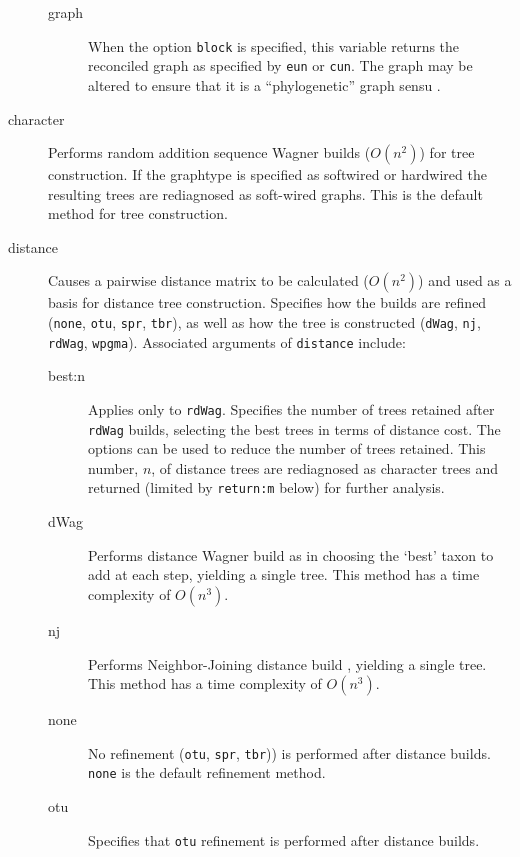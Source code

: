 \begin{description}
\begin{description}
			\item[graph] When the option \texttt{block} is specified, this variable returns the 
			reconciled graph as specified by \texttt{eun} or \texttt{cun}. The graph may be 
			altered to ensure that it is a ``phylogenetic'' graph sensu \cite{Moretetal2005}.
		\end{description}			
		
		\item [character] Performs random addition sequence Wagner \citep{Farris1970} builds 
		($O(n^2)$) for tree construction. If the graphtype is specified as softwired or hardwired 
		the resulting trees are rediagnosed as soft-wired graphs. This is 
		the default method for tree construction.
		
		\item [distance] Causes a pairwise distance matrix to be calculated ($O(n^2)$) and used 
		as a basis for distance tree construction. Specifies how the builds are refined (\texttt{none}, 
		\texttt{otu}, \texttt{spr}, \texttt{tbr}), as well as how the tree is constructed (\texttt{dWag}, 
		\texttt{nj}, \texttt{rdWag}, \texttt{wpgma}). Associated arguments of \texttt{distance} include:
				
		\begin{description}
			\item[best:n] Applies only to \texttt{rdWag}. Specifies the number of trees retained 
			after 	\texttt{rdWag} builds, selecting the best trees in terms of distance cost. The 
			options can be used to reduce the number of trees retained.  
			This number, $n$, of distance trees are rediagnosed as character trees
			and returned (limited by \texttt{return:m} below) for further analysis.
			
			\item[dWag] Performs distance Wagner build as in \citep{Farris1972} choosing the 
			`best' taxon to 
			add at each step, yielding a single tree. This method has a time complexity of $O(n^3)$.

			\item[nj] Performs Neighbor-Joining distance build \citep{Saitou1987}, yielding a single 
			tree. This method has a time complexity of $O(n^3)$.

			\item[none] No refinement (\texttt{otu}, \texttt{spr}, \texttt{tbr})) is performed after 
			distance builds. \texttt{none} is the default refinement method.
						
			\item[otu] Specifies that \texttt{otu} refinement \citep{Wheeler2021} is performed 
			after distance 
			builds.
			

\end{description}
\end{description}
